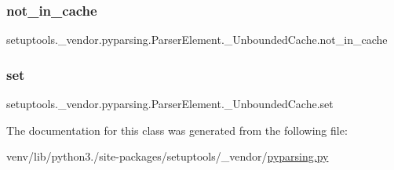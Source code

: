 \subsubsection{\texorpdfstring{not\+\_\+in\+\_\+cache}{not\_in\_cache}}
{\footnotesize\ttfamily setuptools.\+\_\+vendor.\+pyparsing.\+Parser\+Element.\+\_\+\+Unbounded\+Cache.\+not\+\_\+in\+\_\+cache}

\mbox{\label{classsetuptools_1_1__vendor_1_1pyparsing_1_1ParserElement_1_1__UnboundedCache_a496b36f48ec38f887e2285686354d4f5}} 
\subsubsection{\texorpdfstring{set}{set}}
{\footnotesize\ttfamily setuptools.\+\_\+vendor.\+pyparsing.\+Parser\+Element.\+\_\+\+Unbounded\+Cache.\+set}



The documentation for this class was generated from the following file\+:\begin{DoxyCompactItemize}
\item 
venv/lib/python3./site-\/packages/setuptools/\+\_\+vendor/\hyperlink{setuptools_2__vendor_2pyparsing_8py}{pyparsing.\+py}\end{DoxyCompactItemize}

